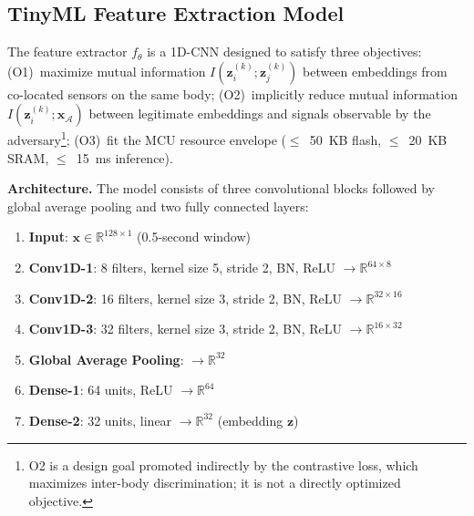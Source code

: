 \documentclass[sensors,article,submit,pdftex,moreauthors]{Definitions/mdpi}
\begin{document}
\subsection{TinyML Feature Extraction Model}
\label{subsec:tinyml_model}

The feature extractor $f_\theta$ is a 1D-CNN designed to satisfy three objectives: (O1)~maximize mutual information $I(\mathbf{z}_i^{(k)}; \mathbf{z}_j^{(k)})$ between embeddings from co-located sensors on the same body; (O2)~implicitly reduce mutual information $I(\mathbf{z}_i^{(k)}; \mathbf{x}_{\mathcal{A}})$ between legitimate embeddings and signals observable by the adversary\footnote{O2 is a design goal promoted indirectly by the contrastive loss, which maximizes inter-body discrimination; it is not a directly optimized objective.}; (O3)~fit the MCU resource envelope ($\leq$~50~KB flash, $\leq$~20~KB SRAM, $\leq$~15~ms inference).

\textbf{Architecture.} The model consists of three convolutional blocks followed by global average pooling and two fully connected layers:

\begin{enumerate}
    \item \textbf{Input}: $\mathbf{x} \in \mathbb{R}^{128 \times 1}$ (0.5-second window)
    \item \textbf{Conv1D-1}: 8 filters, kernel size 5, stride 2, BN, ReLU $\rightarrow \mathbb{R}^{64 \times 8}$
    \item \textbf{Conv1D-2}: 16 filters, kernel size 3, stride 2, BN, ReLU $\rightarrow \mathbb{R}^{32 \times 16}$
    \item \textbf{Conv1D-3}: 32 filters, kernel size 3, stride 2, BN, ReLU $\rightarrow \mathbb{R}^{16 \times 32}$
    \item \textbf{Global Average Pooling}: $\rightarrow \mathbb{R}^{32}$
    \item \textbf{Dense-1}: 64 units, ReLU $\rightarrow \mathbb{R}^{64}$
    \item \textbf{Dense-2}: 32 units, linear $\rightarrow \mathbb{R}^{32}$ (embedding $\mathbf{z}$)
\end{enumerate}
\end{document}
